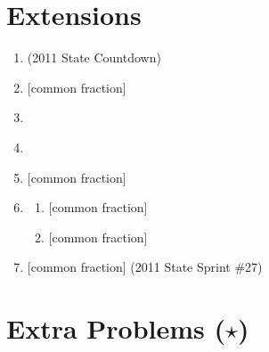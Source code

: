 \documentclass{article}
\begin{document}
\section*{Extensions}
\vspace{1cm}
\begin{enumerate}
\item \underline{\hspace{3in}} (2011 State Countdown)\vspace{1cm}
\item \underline{\hspace{3in}} [common fraction]\vspace{1cm}
\item \underline{\hspace{3in}}\vspace{1cm}
\item \underline{\hspace{3in}}\vspace{1cm}
\item \underline{\hspace{3in}} [common fraction]\vspace{1cm}
\item \begin{enumerate}
\item \underline{\hspace{2.7in}} [common fraction]\vspace{1cm}
\item \underline{\hspace{2.7in}} [common fraction]\vspace{1cm}
\end{enumerate}
\item \underline{\hspace{3in}} [common fraction] (2011 State Sprint \#27)
\end{enumerate}


\newpage

\section*{Extra Problems ($\star$)}
\end{document}
